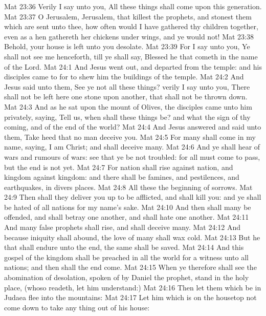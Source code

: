 \vs Mat 23:36 Verily I say unto you, All these things shall come upon this generation.
\vs Mat 23:37 O Jerusalem, Jerusalem,  that killest the prophets, and stonest them which are sent unto thee, how often would I have gathered thy children together, even as a hen gathereth her chickens under  wings, and ye would not!
\vs Mat 23:38 Behold, your house is left unto you desolate.
\vs Mat 23:39 For I say unto you, Ye shall not see me henceforth, till ye shall say, Blessed  he that cometh in the name of the Lord.
\vs Mat 24:1 And Jesus went out, and departed from the temple: and his disciples came to  for to shew him the buildings of the temple.
\vs Mat 24:2 And Jesus said unto them, See ye not all these things? verily I say unto you, There shall not be left here one stone upon another, that shall not be thrown down.
\vs Mat 24:3 And as he sat upon the mount of Olives, the disciples came unto him privately, saying, Tell us, when shall these things be? and what  the sign of thy coming, and of the end of the world?
\vs Mat 24:4 And Jesus answered and said unto them, Take heed that no man deceive you.
\vs Mat 24:5 For many shall come in my name, saying, I am Christ; and shall deceive many.
\vs Mat 24:6 And ye shall hear of wars and rumours of wars: see that ye be not troubled: for all  must come to pass, but the end is not yet.
\vs Mat 24:7 For nation shall rise against nation, and kingdom against kingdom: and there shall be famines, and pestilences, and earthquakes, in divers places.
\vs Mat 24:8 All these  the beginning of sorrows.
\vs Mat 24:9 Then shall they deliver you up to be afflicted, and shall kill you: and ye shall be hated of all nations for my name's sake.
\vs Mat 24:10 And then shall many be offended, and shall betray one another, and shall hate one another.
\vs Mat 24:11 And many false prophets shall rise, and shall deceive many.
\vs Mat 24:12 And because iniquity shall abound, the love of many shall wax cold.
\vs Mat 24:13 But he that shall endure unto the end, the same shall be saved.
\vs Mat 24:14 And this gospel of the kingdom shall be preached in all the world for a witness unto all nations; and then shall the end come.
\vs Mat 24:15 When ye therefore shall see the abomination of desolation, spoken of by Daniel the prophet, stand in the holy place, (whoso readeth, let him understand:)
\vs Mat 24:16 Then let them which be in Judaea flee into the mountains:
\vs Mat 24:17 Let him which is on the housetop not come down to take any thing out of his house:
